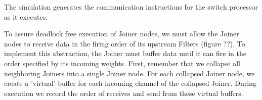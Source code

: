 The simulation generates the communication instructions for the switch
processor as it executes.

To assure deadlock free execution of Joiner nodes, we must allow the
Joiner nodes to receive data in the firing order of its upstream
Filters (figure ??). To implement this abstraction, the Joiner must
buffer data until it can fire in the order specified by its incoming
weights.  First, remember that we collapse all neighboring Joiners
into a single Joiner node.  For each collapsed Joiner node, we create
a 'virtual' buffer for each incoming channel of the collapsed Joiner.
During execution we record the order of receives and send from these
virtual buffers.
 

